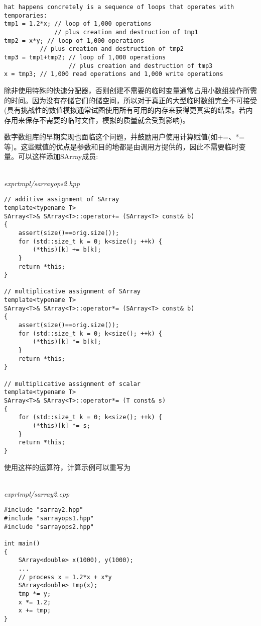 \begin{lstlisting}[style=styleCXX]
hat happens concretely is a sequence of loops that operates with temporaries:
tmp1 = 1.2*x; // loop of 1,000 operations
			  // plus creation and destruction of tmp1
tmp2 = x*y; // loop of 1,000 operations
		  // plus creation and destruction of tmp2
tmp3 = tmp1+tmp2; // loop of 1,000 operations
				  // plus creation and destruction of tmp3
x = tmp3; // 1,000 read operations and 1,000 write operations
\end{lstlisting}

除非使用特殊的快速分配器，否则创建不需要的临时变量通常占用小数组操作所需的时间。因为没有存储它们的储空间，所以对于真正的大型临时数组完全不可接受(具有挑战性的数值模拟通常试图使用所有可用的内存来获得更真实的结果。若内存用来保存不需要的临时文件，模拟的质量就会受到影响)。

数字数组库的早期实现也面临这个问题，并鼓励用户使用计算赋值(如+=、*=等)。这些赋值的优点是参数和目的地都是由调用方提供的，因此不需要临时变量。可以这样添加SArray成员:

\hspace*{\fill} \\ %
\noindent
\textit{exprtmpl/sarrayops2.hpp}
\begin{lstlisting}[style=styleCXX]
// additive assignment of SArray
template<typename T>
SArray<T>& SArray<T>::operator+= (SArray<T> const& b)
{
	assert(size()==orig.size());
	for (std::size_t k = 0; k<size(); ++k) {
		(*this)[k] += b[k];
	}
	return *this;
}

// multiplicative assignment of SArray
template<typename T>
SArray<T>& SArray<T>::operator*= (SArray<T> const& b)
{
	assert(size()==orig.size());
	for (std::size_t k = 0; k<size(); ++k) {
		(*this)[k] *= b[k];
	}
	return *this;
}

// multiplicative assignment of scalar
template<typename T>
SArray<T>& SArray<T>::operator*= (T const& s)
{
	for (std::size_t k = 0; k<size(); ++k) {
		(*this)[k] *= s;
	}
	return *this;
}
\end{lstlisting}

使用这样的运算符，计算示例可以重写为

\hspace*{\fill} \\ %
\noindent
\textit{exprtmpl/sarray2.cpp}
\begin{lstlisting}[style=styleCXX]
#include "sarray2.hpp"
#include "sarrayops1.hpp"
#include "sarrayops2.hpp"

int main()
{
	SArray<double> x(1000), y(1000);
	...
	// process x = 1.2*x + x*y
	SArray<double> tmp(x);
	tmp *= y;
	x *= 1.2;
	x += tmp;
}
\end{lstlisting}

